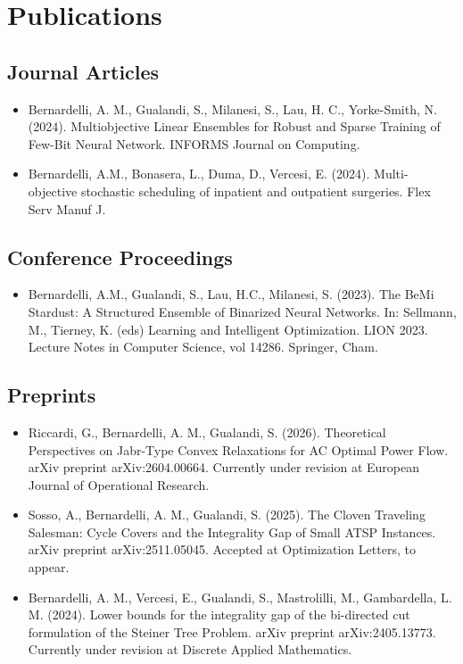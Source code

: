 \documentclass[11pt,a4paper]{article}
\begin{document}
\section*{Publications}
\subsection*{Journal Articles}
\begin{itemize}
    \item[\texttt{[J2]}] Bernardelli, A. M., Gualandi, S., Milanesi, S., Lau, H. C., Yorke-Smith, N. (2024). Multiobjective Linear Ensembles for Robust and Sparse Training of Few-Bit Neural Network. INFORMS Journal on Computing.
    \item[\texttt{[J1]}] Bernardelli, A.M., Bonasera, L., Duma, D., Vercesi, E. (2024). Multi-objective stochastic scheduling of inpatient and outpatient surgeries. Flex Serv Manuf J. 
\end{itemize}
\subsection*{Conference Proceedings}
\begin{itemize}[noitemsep, labelwidth=*,align=left, labelwidth=!]
    \item[\texttt{[P1]}] Bernardelli, A.M., Gualandi, S., Lau, H.C., Milanesi, S. (2023). The BeMi Stardust: A Structured Ensemble of Binarized Neural Networks. In: Sellmann, M., Tierney, K. (eds) Learning and Intelligent Optimization. LION 2023. Lecture Notes in Computer Science, vol 14286. Springer, Cham.
\end{itemize}
\subsection*{Preprints}
\begin{itemize}[noitemsep, labelwidth=*,align=left, labelwidth=!]
    \item[\texttt{[A3]}] Riccardi, G., Bernardelli, A. M., Gualandi, S. (2026). Theoretical Perspectives on Jabr-Type Convex Relaxations for AC Optimal Power Flow. arXiv preprint arXiv:2604.00664. Currently under revision at European Journal of Operational Research.
    \item[\texttt{[A2]}] Sosso, A., Bernardelli, A. M., Gualandi, S. (2025). The Cloven Traveling Salesman: Cycle Covers and the Integrality Gap of Small ATSP Instances. arXiv preprint arXiv:2511.05045. Accepted at Optimization Letters, to appear.
    \item[\texttt{[A1]}] Bernardelli, A. M., Vercesi, E., Gualandi, S., Mastrolilli, M., Gambardella, L. M. (2024). Lower bounds for the integrality gap of the bi-directed cut formulation of the Steiner Tree Problem. arXiv preprint arXiv:2405.13773. Currently under revision at Discrete Applied Mathematics.
\end{itemize}
\end{document}
